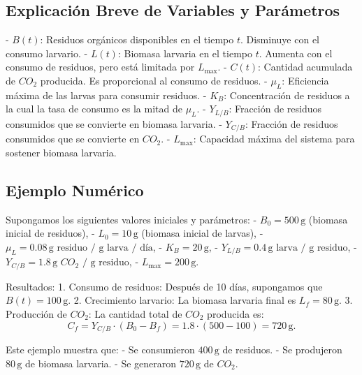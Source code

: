 \documentclass[12pt]{article}
\begin{document}
\subsection{Explicación Breve de Variables y Parámetros}

- $B(t)$: Residuos orgánicos disponibles en el tiempo $t$. Disminuye con el consumo larvario.
- $L(t)$: Biomasa larvaria en el tiempo $t$. Aumenta con el consumo de residuos, pero está limitada por $L_{\text{max}}$.
- $C(t)$: Cantidad acumulada de $CO_2$ producida. Es proporcional al consumo de residuos.
- $\mu_L$: Eficiencia máxima de las larvas para consumir residuos.
- $K_B$: Concentración de residuos a la cual la tasa de consumo es la mitad de $\mu_L$.
- $Y_{L/B}$: Fracción de residuos consumidos que se convierte en biomasa larvaria.
- $Y_{C/B}$: Fracción de residuos consumidos que se convierte en $CO_2$.
- $L_{\text{max}}$: Capacidad máxima del sistema para sostener biomasa larvaria.

\subsection{Ejemplo Numérico}

Supongamos los siguientes valores iniciales y parámetros:
- $B_0 = 500 \, \text{g}$ (biomasa inicial de residuos),
- $L_0 = 10 \, \text{g}$ (biomasa inicial de larvas),
- $\mu_L = 0.08 \, \text{g residuo / g larva / día}$,
- $K_B = 20 \, \text{g}$,
- $Y_{L/B} = 0.4 \, \text{g larva / g residuo}$,
- $Y_{C/B} = 1.8 \, \text{g $CO_2$ / g residuo}$,
- $L_{\text{max}} = 200 \, \text{g}$.

 Resultados:
1. Consumo de residuos: Después de 10 días, supongamos que $B(t) = 100 \, \text{g}$.
2. Crecimiento larvario: La biomasa larvaria final es $L_f = 80 \, \text{g}$.
3. Producción de $CO_2$: La cantidad total de $CO_2$ producida es:
   \[
   C_f = Y_{C/B} \cdot (B_0 - B_f) = 1.8 \cdot (500 - 100) = 720 \, \text{g}.
   \]

Este ejemplo muestra que:
- Se consumieron $400 \, \text{g}$ de residuos.
- Se produjeron $80 \, \text{g}$ de biomasa larvaria.
- Se generaron $720 \, \text{g}$ de $CO_2$.
\end{document}
